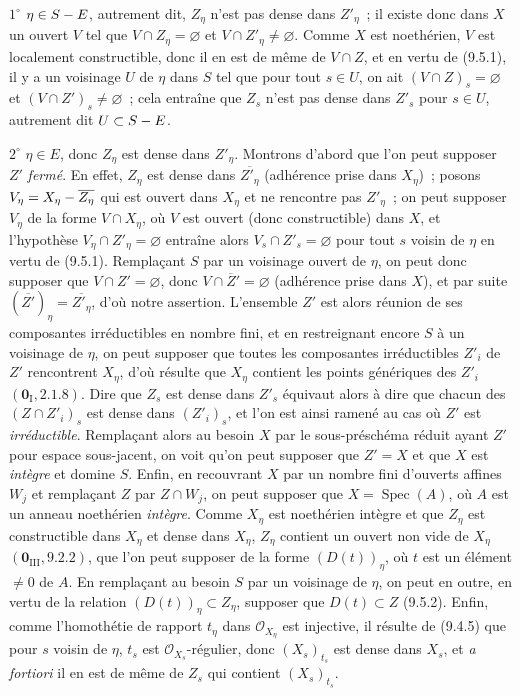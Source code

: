 $1^\circ$ $\eta\in S- E$, autrement dit, $Z_\eta$ n'est pas dense dans
$Z'_\eta$~; il existe donc dans $X$ un ouvert $V$ tel que
$V\cap Z_\eta=\varnothing$ et $V\cap Z'_\eta\neq\varnothing$. Comme $X$ est
noethérien, $V$ est localement constructible, donc il en est de même de
$V\cap Z$, et en vertu de (9.5.1), il y a un voisinage $U$ de $\eta$ dans $S$
tel que pour tout $s\in U$, on ait $(V\cap Z)_s=\varnothing$ et
$(V\cap Z')_s\neq\varnothing$~; cela entraîne que $Z_s$ n'est pas dense dans
$Z'_s$ pour $s\in U$, autrement dit $U\subset S- E$.


$2^\circ$ $\eta\in E$, donc $Z_\eta$ est dense dans $Z'_\eta$. Montrons
d'abord que l'on peut supposer $Z'$ \emph{fermé}. En effet, $Z_\eta$ est dense
dans $\overline{Z'_\eta}$ (adhérence prise dans $X_\eta$)~; posons
$V_\eta=X_\eta-\overline{Z_\eta}$ qui est ouvert dans $X_\eta$ et ne
rencontre pas $Z'_\eta$~; on peut supposer $V_\eta$ de la forme $V\cap X_\eta$,
où $V$ est ouvert (donc constructible) dans $X$, et l'hypothèse
$V_\eta\cap Z'_\eta=\varnothing$ entraîne alors
$V_s\cap Z'_s=\varnothing$ pour tout $s$ voisin de $\eta$ en vertu de (9.5.1).
Remplaçant $S$ par un voisinage ouvert de $\eta$, on peut donc supposer que
$V\cap Z'=\varnothing$, donc $V\cap\overline Z'=\varnothing$ (adhérence prise
dans $X$), et par suite $(\overline{Z'})_\eta=\overline{Z'_\eta}$, d'où notre
assertion. L'ensemble $Z'$ est alors réunion de ses composantes irréductibles
en nombre fini, et en restreignant encore $S$ à un voisinage de $\eta$, on
peut supposer que toutes les composantes irréductibles $Z'_i$ de $Z'$
rencontrent $X_\eta$, d'où résulte que $X_\eta$ contient les points génériques
des $Z'_i$ $(\mathbf 0_{\mathrm I},2.1.8)$. Dire que $Z_s$ est dense dans
$Z'_s$ équivaut alors à dire que chacun des $(Z\cap Z'_i)_s$ est dense dans
$(Z'_i)_s$, et l'on est ainsi ramené au cas où $Z'$ est \emph{irréductible}.
Remplaçant alors au besoin $X$ par le sous-préschéma réduit ayant $Z'$ pour
espace sous-jacent, on voit qu'on peut supposer que $Z'=X$ et que $X$ est
\emph{intègre} et domine $S$. Enfin, en recouvrant $X$ par un nombre fini
d'ouverts affines $W_j$ et remplaçant $Z$ par $Z\cap W_j$, on peut supposer
que $X=\operatorname{Spec}(A)$, où $A$ est un anneau noethérien \emph{intègre}.
Comme $X_\eta$ est noethérien intègre et que $Z_\eta$ est constructible dans
$X_\eta$ et dense dans $X_\eta$, $Z_\eta$ contient un ouvert non vide de
$X_\eta$ $(\mathbf 0_{\mathrm{III}},9.2.2)$, que l'on peut supposer de la forme
$(D(t))_\eta$, où $t$ est un élément $\neq0$ de $A$. En remplaçant au besoin
$S$ par un voisinage de $\eta$, on peut en outre, en vertu de la relation
$(D(t))_\eta\subset Z_\eta$, supposer que $D(t)\subset Z$ (9.5.2). Enfin,
comme l'homothétie de rapport $t_\eta$ dans $\mathcal O_{X_\eta}$ est
injective, il résulte de (9.4.5) que pour $s$ voisin de $\eta$, $t_s$ est
$\mathcal O_{X_s}$-régulier, donc $(X_s)_{t_s}$ est dense dans $X_s$, et
\emph{a fortiori} il en est de même de $Z_s$ qui contient $(X_s)_{t_s}$.

